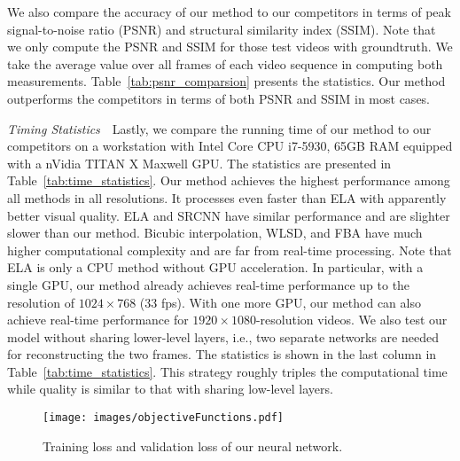 \documentclass[acmtog]{acmart}
\begin{document}
We also compare the accuracy of our method to our competitors in terms of peak
signal-to-noise ratio (PSNR) and structural similarity index (SSIM). Note that
we only compute the PSNR and SSIM for those test videos with groundtruth. We
take the average value over all frames of each video sequence in computing both
measurements. Table~\ref{tab:psnr_comparsion} presents the statistics. Our
method outperforms the competitors in terms of both PSNR
and SSIM in most cases.

\vspace{0.15in}
\noindent\emph{Timing Statistics}\,\,\,\,
Lastly, we compare the running time of our method to our competitors on a
workstation with Intel Core CPU i7-5930, 65GB RAM equipped with a nVidia TITAN X
Maxwell GPU. The statistics are presented in Table~\ref{tab:time_statistics}.
Our method achieves the highest performance among all methods in all
resolutions. It processes even faster than ELA with apparently better visual
quality. ELA and SRCNN have similar performance and are slighter slower than our
method. Bicubic interpolation, WLSD, and FBA have much higher computational
complexity and are far from real-time processing.  Note that ELA is only a CPU
method without GPU acceleration. In particular, with a single GPU, our method
already achieves real-time performance up to the resolution of $1024\times 768$
(33 fps). With one more GPU, our method can also achieve real-time performance
for $1920\times 1080$-resolution videos. We also test our model without sharing
lower-level layers, i.e., two separate networks are needed for reconstructing
the two frames. The statistics is shown in the last column in
Table~\ref{tab:time_statistics}. This strategy roughly triples the computational
time while quality is similar to that with sharing low-level layers.



\begin{figure}[!tp]
	\centering
	\texttt{[image: images/objectiveFunctions.pdf]}\\
	\caption{Training loss and validation loss of our neural network.}\label{fig:training_loss}
\end{figure}
\end{document}
